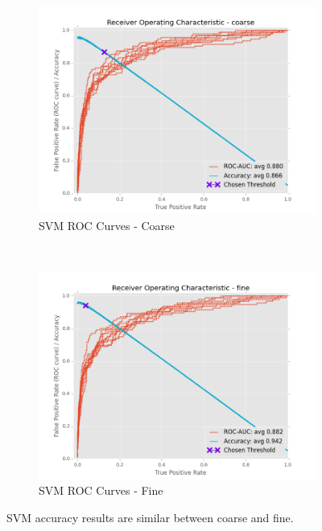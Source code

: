 \documentclass[ms]{nuthesis}
\begin{document}
\FloatBarrier
\begin{figure}[!htb]
    \centering
    \begin{subfigure}[t]{0.5\textwidth}
        \centering
        \includegraphics[width=\textwidth]{fig/SVM_FindThreshold_RocCurve_coarse}
        \caption{SVM ROC Curves - Coarse}
    \end{subfigure}%
    ~
    \begin{subfigure}[t]{0.5\textwidth}
        \centering
        \includegraphics[width=\textwidth]{fig/SVM_FindThreshold_RocCurve_fine}
        \caption{SVM ROC Curves - Fine}
    \end{subfigure}
    \caption{SVM accuracy results are similar between coarse and fine.}
    \label{fig:SVMThreshRoc}
\end{figure}
\FloatBarrier
\end{document}
